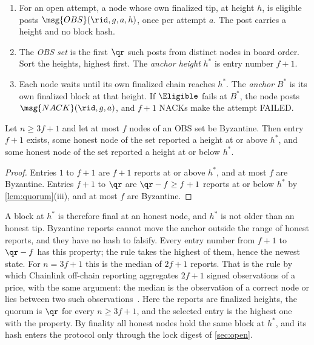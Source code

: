 \begin{enumerate}[leftmargin=1.7em,itemsep=1pt]
\item For an open attempt, a node whose own finalized tip, at height $h$, is eligible posts $\msg{OBS}(\rid, g, a, h)$, once per attempt $a$. The post carries a height and no block hash.
\item The \emph{OBS set} is the first $\qr$ such posts from distinct nodes in board order. Sort the heights, highest first. The \emph{anchor height} $h^*$ is entry number $f+1$.
\item Each node waits until its own finalized chain reaches $h^*$. The \emph{anchor} $B^*$ is its own finalized block at that height. If $\Eligible$ fails at $B^*$, the node posts $\msg{NACK}(\rid, g, a)$, and $f+1$ NACKs make the attempt \textsf{FAILED}.
\end{enumerate}

\begin{lemma}[Anchor]\label{lem:anchor}
Let $n \ge 3f+1$ and let at most $f$ nodes of an OBS set be Byzantine. Then entry $f+1$ exists, some honest node of the set reported a height at or above $h^*$, and some honest node of the set reported a height at or below $h^*$.
\end{lemma}

\begin{proof}
Entries $1$ to $f+1$ are $f+1$ reports at or above $h^*$, and at most $f$ are Byzantine. Entries $f+1$ to $\qr$ are $\qr - f \ge f+1$ reports at or below $h^*$ by \cref{lem:quorum}(iii), and at most $f$ are Byzantine.
\end{proof}

A block at $h^*$ is therefore final at an honest node, and $h^*$ is not older than an honest tip. Byzantine reports cannot move the anchor outside the range of honest reports, and they have no hash to falsify. Every entry number from $f+1$ to $\qr - f$ has this property; the rule takes the highest of them, hence the newest state. For $n = 3f+1$ this is the median of $2f+1$ reports. That is the rule by which Chainlink off-chain reporting aggregates $2f+1$ signed observations of a price, with the same argument: the median is the observation of a correct node or lies between two such observations~\cite[Section~3 and Lemma~8]{OCR21}. Here the reports are finalized heights, the quorum is $\qr$ for every $n \ge 3f+1$, and the selected entry is the highest one with the property. By finality all honest nodes hold the same block at $h^*$, and its hash enters the protocol only through the lock digest of \cref{sec:open}.

